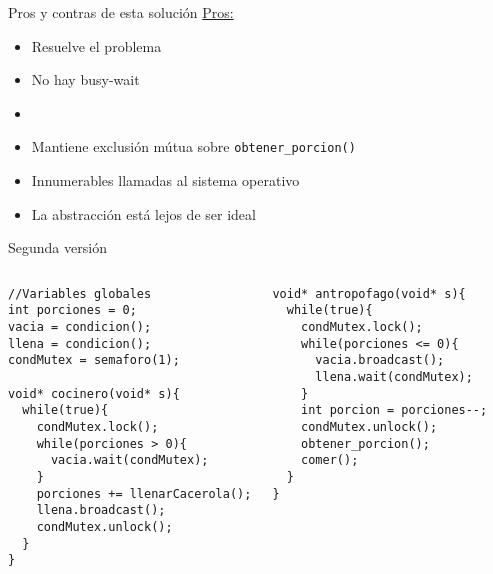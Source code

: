 \documentclass[presentation]{beamer}
\begin{document}
\begin{frame}{Pros y contras de esta solución}
\underline{Pros:}
\begin{itemize}
\item<1-> Resuelve el problema
\item<2-> No hay busy-wait
\item<3->  
\end{itemize}

\begin{itemize}
\item <4-> Mantiene exclusión mútua sobre \texttt{obtener\_porcion()}
\item<5-> Innumerables llamadas al sistema operativo
\item<6-> La abstracción está lejos de ser ideal
\end{itemize}

\end{frame}


\begin{frame}[fragile]{Segunda versión}

\lstset{language=C++, basicstyle=\scriptsize}

\begin{columns}

\begin{lstlisting}
//Variables globales
int porciones = 0;
vacia = condicion();
llena = condicion();
condMutex = semaforo(1);

void* cocinero(void* s){
  while(true){
    condMutex.lock();
    while(porciones > 0){
      vacia.wait(condMutex);
    }
    porciones += llenarCacerola();
    llena.broadcast();
    condMutex.unlock();
  }
}
\end{lstlisting}


\begin{lstlisting}
void* antropofago(void* s){
  while(true){
    condMutex.lock();
    while(porciones <= 0){
      vacia.broadcast();
      llena.wait(condMutex);
    }
    int porcion = porciones--;
    condMutex.unlock();  
    obtener_porcion();
    comer();    
  }
}
\end{lstlisting}


\end{columns}

\end{frame}
\end{document}
